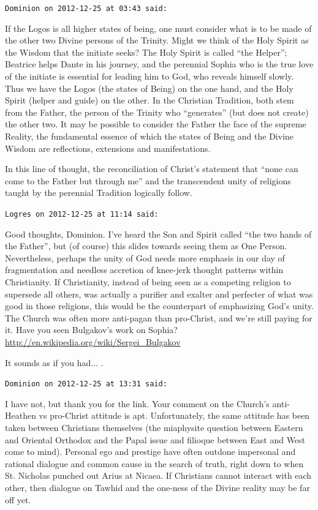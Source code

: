 \begin{footnotesize}
\begin{sffamily}
\texttt{Dominion on 2012-12-25 at 03:43 said:}

If the Logos is all higher states of being, one must consider what is to be made of the other two Divine persons of the Trinity. Might we think of the Holy Spirit as the Wisdom that the initiate seeks? The Holy Spirit is called ``the Helper''; Beatrice helps Dante in his journey, and the perennial Sophia who is the true love of the initiate is essential for leading him to God, who reveals himself slowly. Thus we have the Logos (the states of Being) on the one hand, and the Holy Spirit (helper and guide) on the other. In the Christian Tradition, both stem from the Father, the person of the Trinity who ``generates'' (but does not create) the other two. It may be possible to consider the Father the face of the supreme Reality, the fundamental essence of which the states of Being and the Divine Wisdom are reflections, extensions and manifestations.

In this line of thought, the reconciliation of Christ's statement that ``none can come to the Father but through me'' and the transcendent unity of religions taught by the perennial Tradition logically follow.

\hfill

\texttt{Logres on 2012-12-25 at 11:14 said:}

Good thoughts, Dominion. I've heard the Son and Spirit called ``the two hands of the Father'', but (of course) this slides towards seeing them as One Person. Nevertheless, perhaps the unity of God needs more emphasis in our day of fragmentation and needless accretion of knee-jerk thought patterns within Christianity. If Christianity, instead of being seen as a competing religion to supersede all others, was actually a purifier and exalter and perfecter of what was good in those religions, this would be the counterpart of emphasizing God's unity. The Church was often more anti-pagan than pro-Christ, and we're still paying for it. Have you seen Bulgakov's work on Sophia?
\url{http://en.wikipedia.org/wiki/Sergei\_Bulgakov}

It sounds as if you had... .

\hfill

\texttt{Dominion on 2012-12-25 at 13:31 said:}

I have not, but thank you for the link. Your comment on the Church's anti-Heathen vs pro-Christ attitude is apt. Unfortunately, the same attitude has been taken between Christians themselves (the miaphysite question between Eastern and Oriental Orthodox and the Papal issue and filioque between East and West come to mind). Personal ego and prestige have often outdone impersonal and rational dialogue and common cause in the search of truth, right down to when St. Nicholas punched out Arius at Nicaea. If Christians cannot interact with each other, then dialogue on Tawhid and the one-ness of the Divine reality may be far off yet.


\end{sffamily}
\end{footnotesize}
